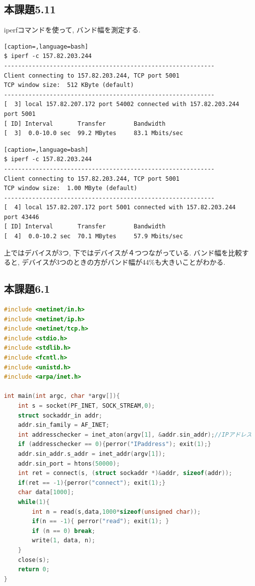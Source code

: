 \documentclass{ltjsarticle}
\begin{document}
\subsection*{本課題5.11}
iperfコマンドを使って, バンド幅を測定する. 
\begin{lstlisting}[caption=,language=bash]
$ iperf -c 157.82.203.244
------------------------------------------------------------
Client connecting to 157.82.203.244, TCP port 5001
TCP window size:  512 KByte (default)
------------------------------------------------------------
[  3] local 157.82.207.172 port 54002 connected with 157.82.203.244 port 5001
[ ID] Interval       Transfer        Bandwidth
[  3]  0.0-10.0 sec  99.2 MBytes     83.1 Mbits/sec
\end{lstlisting}
\begin{lstlisting}[caption=,language=bash]
$ iperf -c 157.82.203.244
------------------------------------------------------------
Client connecting to 157.82.203.244, TCP port 5001
TCP window size:  1.00 MByte (default)
------------------------------------------------------------
[  4] local 157.82.207.172 port 5001 connected with 157.82.203.244 port 43446
[ ID] Interval       Transfer        Bandwidth
[  4]  0.0-10.2 sec  70.1 MBytes     57.9 Mbits/sec
\end{lstlisting}
上ではデバイスが3つ, 下ではデバイスが４つつながっている. バンド幅を比較すると, デバイスが3つのときの方がバンド幅が44\%も大きいことがわかる. 


\subsection*{本課題6.1}

\begin{lstlisting}[caption=client\_recv.c,language=C]
#include <netinet/in.h>
#include <netinet/ip.h>
#include <netinet/tcp.h>
#include <stdio.h>
#include <stdlib.h>
#include <fcntl.h>
#include <unistd.h>
#include <arpa/inet.h>

int main(int argc, char *argv[]){
    int s = socket(PF_INET, SOCK_STREAM,0);
    struct sockaddr_in addr;
    addr.sin_family = AF_INET;
    int addresschecker = inet_aton(argv[1], &addr.sin_addr);//IPアドレス
    if (addresschecker == 0){perror("IPaddress"); exit(1);}
    addr.sin_addr.s_addr = inet_addr(argv[1]);
    addr.sin_port = htons(50000);
    int ret = connect(s, (struct sockaddr *)&addr, sizeof(addr));
    if(ret == -1){perror("connect"); exit(1);}
    char data[1000];
    while(1){
        int n = read(s,data,1000*sizeof(unsigned char));
        if(n == -1){ perror("read"); exit(1); }
        if (n == 0) break;
        write(1, data, n);
    }
    close(s);
    return 0;
}
\end{lstlisting}
\end{document}
